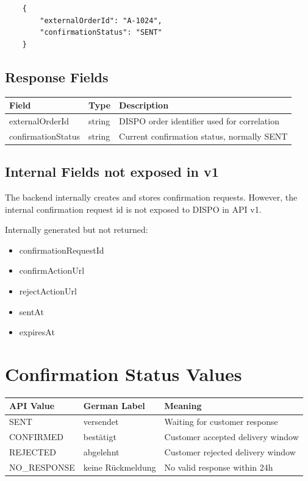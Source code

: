 \documentclass[a4paper,11pt]{article}
\begin{document}
\begin{lstlisting}
	{
		"externalOrderId": "A-1024",
		"confirmationStatus": "SENT"
	}
\end{lstlisting}

\subsection{Response Fields}

\begin{longtable}{p{4cm}p{2cm}p{8cm}}
	\toprule
	Field & Type & Description \\
	\midrule
	externalOrderId & string & DISPO order identifier used for correlation \\
	confirmationStatus & string & Current confirmation status, normally SENT \\
	\bottomrule
\end{longtable}

\subsection{Internal Fields not exposed in v1}

The backend internally creates and stores confirmation requests. However, the internal confirmation request id is not exposed to DISPO in API v1.

Internally generated but not returned:

\begin{itemize}
	\item confirmationRequestId
	\item confirmActionUrl
	\item rejectActionUrl
	\item sentAt
	\item expiresAt
\end{itemize}
	
	\section{Confirmation Status Values}
	
	\begin{longtable}{p{3cm}p{3cm}p{8cm}}
		\toprule
		API Value & German Label & Meaning \\
		\midrule
		SENT & versendet & Waiting for customer response \\
		CONFIRMED & bestätigt & Customer accepted delivery window \\
		REJECTED & abgelehnt & Customer rejected delivery window \\
		NO\_RESPONSE & keine Rückmeldung & No valid response within 24h \\
		\bottomrule
	\end{longtable}
	
\end{document}
